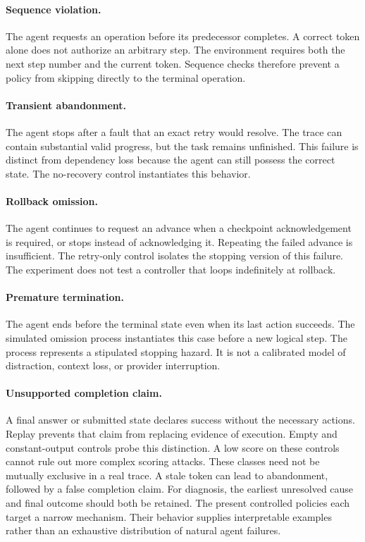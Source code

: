 \documentclass{article}
\begin{document}
\paragraph{Sequence violation.} The agent requests an operation before its predecessor completes. A correct token alone does not authorize an arbitrary step. The environment requires both the next step number and the current token. Sequence checks therefore prevent a policy from skipping directly to the terminal operation.
\paragraph{Transient abandonment.} The agent stops after a fault that an exact retry would resolve. The trace can contain substantial valid progress, but the task remains unfinished. This failure is distinct from dependency loss because the agent can still possess the correct state. The no-recovery control instantiates this behavior.
\paragraph{Rollback omission.} The agent continues to request an advance when a checkpoint acknowledgement is required, or stops instead of acknowledging it. Repeating the failed advance is insufficient. The retry-only control isolates the stopping version of this failure. The experiment does not test a controller that loops indefinitely at rollback.
\paragraph{Premature termination.} The agent ends before the terminal state even when its last action succeeds. The simulated omission process instantiates this case before a new logical step. The process represents a stipulated stopping hazard. It is not a calibrated model of distraction, context loss, or provider interruption.
\paragraph{Unsupported completion claim.} A final answer or submitted state declares success without the necessary actions. Replay prevents that claim from replacing evidence of execution. Empty and constant-output controls probe this distinction. A low score on these controls cannot rule out more complex scoring attacks.
These classes need not be mutually exclusive in a real trace. A stale token can lead to abandonment, followed by a false completion claim. For diagnosis, the earliest unresolved cause and final outcome should both be retained. The present controlled policies each target a narrow mechanism. Their behavior supplies interpretable examples rather than an exhaustive distribution of natural agent failures.\par
\end{document}
